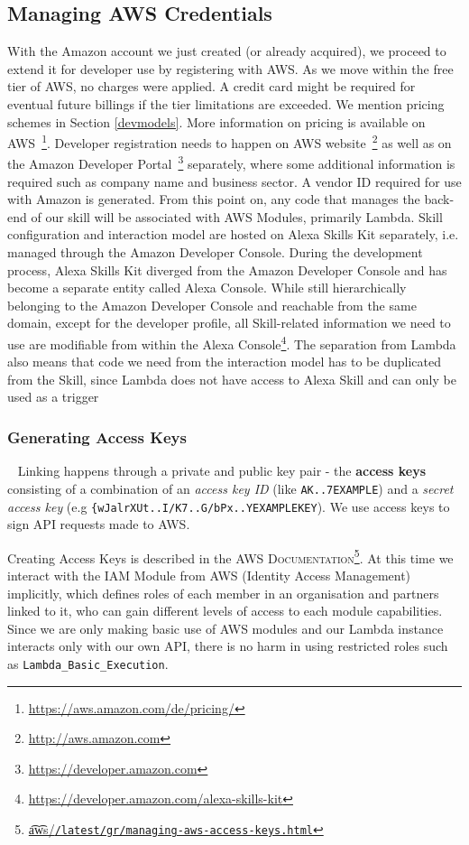 \subsection*{Managing AWS Credentials}

With the Amazon account we just created (or already acquired), we proceed to extend it for developer use by registering with AWS. %
As we move within the free tier of AWS, no charges were applied. A credit card might be required for eventual future billings if the tier limitations are exceeded. We mention pricing schemes in Section \ref{devmodels}. More information on pricing is available on AWS~\footnote{\url{https://aws.amazon.com/de/pricing/}}. Developer registration needs to happen on AWS website~\footnote{\url{http://aws.amazon.com}} as well as on the Amazon Developer Portal~\footnote{\url{https://developer.amazon.com}} separately, where some additional information is required such as company name and business sector. A vendor ID required for use with Amazon is generated. From this point on, any code that manages the back-end of our skill will be associated with AWS Modules, primarily Lambda. Skill configuration and interaction model are hosted on Alexa Skills Kit separately, i.e. managed through the Amazon Developer Console. During the development process, Alexa Skills Kit diverged from the Amazon Developer Console and has become a separate entity called Alexa Console. While still hierarchically belonging to the Amazon Developer Console and reachable from the same domain, except for the developer profile, all Skill-related information we need to use are modifiable from within the Alexa Console\footnote{\url{https://developer.amazon.com/alexa-skills-kit}}. The separation from Lambda also means that code we need from the interaction model has to be duplicated from the Skill, since Lambda does not have access to Alexa Skill and can only be used as a trigger

\subsubsection*{Generating Access Keys}~\label{accesskeys}
Linking happens through a private and public key pair - the \textbf{access keys} consisting of a
combination of an \textit{access key ID} (like \lstinline|AK..7EXAMPLE|) and a \textit{secret access key} (e.g \lstinline|{wJalrXUt..I/K7..G/bPx..YEXAMPLEKEY|). We use access keys to sign API requests made to AWS.

Creating Access Keys is described in the \textsc{AWS Documentation}\footnote{\href{https://docs.aws.amazon.com/general/latest/gr/managing-aws-access-keys.html}{\t{a\t{ws}}/\lstinline|/latest/gr/managing-aws-access-keys.html|}}. At this time we interact with the IAM Module from AWS (Identity Access Management) implicitly, which defines roles of each member in an organisation and partners linked to it, who can gain different levels of access to each module capabilities. Since we are only making basic use of AWS modules and our Lambda instance interacts only with our own API, there is no harm in using restricted roles such as \texttt{Lambda_Basic_Execution}.


